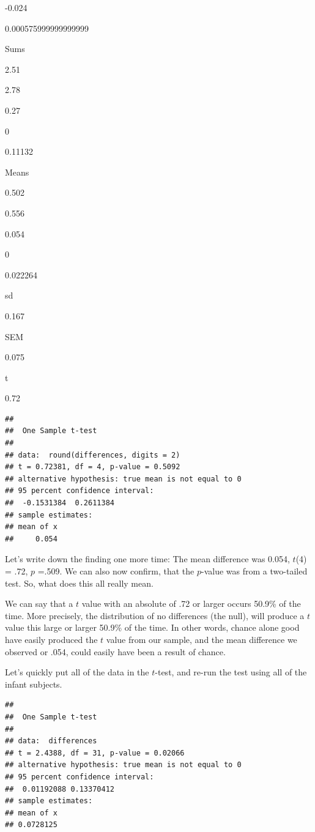 \documentclass[]{book}
\begin{document}
-0.024

0.000575999999999999

Sums

2.51

2.78

0.27

0

0.11132

Means

0.502

0.556

0.054

0

0.022264

sd

0.167

SEM

0.075

t

0.72

\begin{verbatim}
## 
## 	One Sample t-test
## 
## data:  round(differences, digits = 2)
## t = 0.72381, df = 4, p-value = 0.5092
## alternative hypothesis: true mean is not equal to 0
## 95 percent confidence interval:
##  -0.1531384  0.2611384
## sample estimates:
## mean of x 
##     0.054
\end{verbatim}

Let's write down the finding one more time: The mean difference was 0.054, \(t\)(4) = .72, \(p\) =.509. We can also now confirm, that the \(p\)-value was from a two-tailed test. So, what does this all really mean.

We can say that a \(t\) value with an absolute of .72 or larger occurs 50.9\% of the time. More precisely, the distribution of no differences (the null), will produce a \(t\) value this large or larger 50.9\% of the time. In other words, chance alone good have easily produced the \(t\) value from our sample, and the mean difference we observed or .054, could easily have been a result of chance.

Let's quickly put all of the data in the \(t\)-test, and re-run the test using all of the infant subjects.

\begin{verbatim}
## 
## 	One Sample t-test
## 
## data:  differences
## t = 2.4388, df = 31, p-value = 0.02066
## alternative hypothesis: true mean is not equal to 0
## 95 percent confidence interval:
##  0.01192088 0.13370412
## sample estimates:
## mean of x 
## 0.0728125
\end{verbatim}
\end{document}
